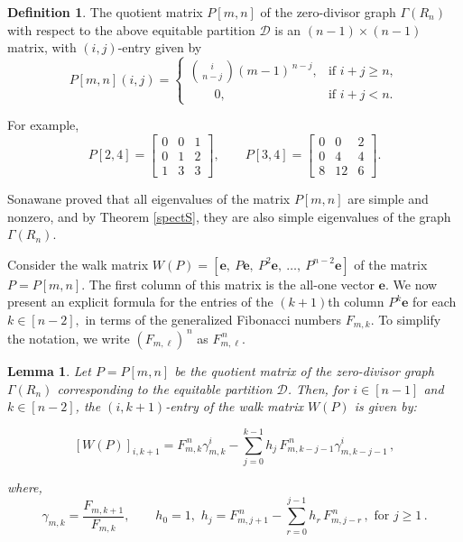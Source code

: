 \documentclass[11pt,oneside]{article}
\theoremstyle{plain}
\theoremstyle{plain}
\newtheorem{lem}[theorem]{Lemma}
\theoremstyle{definition}
\newtheorem{defi}[theorem]{Definition}
\numberwithin{figure}{section}
\theoremstyle{remark}
\numberwithin{equation}{section}
\begin{document}
	\begin{defi}\cite{sonawane1}
		The quotient matrix $P[m,n]$ of the zero-divisor graph $\Gamma(R_n)$ with respect to the above equitable partition $\mathcal{D}$ is an $(n-1) \times (n-1)$ matrix, with $(i,j)$-entry given by
		\[
		P[m,n](i,j) =
		\begin{cases}
			\displaystyle \binom{i}{\,n-j\,}(m-1)^{\,n-j}, & \text{if } i + j \geq n, \\[6pt]
			\quad \quad 0, & \text{if } i + j < n.
		\end{cases}
		\]
	\end{defi}
	
	
	For example, 
	\[
	P[2,4] =
	\begin{bmatrix}
		0 & 0 & 1 \\
		0 & 1 & 2 \\
		1 & 3 & 3
	\end{bmatrix},
	\qquad
	P[3,4] =
	\begin{bmatrix}
		0 & 0 & 2 \\
		0 & 4 & 4 \\
		8 & 12 & 6
	\end{bmatrix}.
	\]
	
	Sonawane \cite{sonawane2} proved that all eigenvalues of the matrix \(  P[m,n]\) are simple and nonzero, and by Theorem \ref{spectS}, they are also simple eigenvalues of the graph $\Gamma(R_n).$
	
	Consider the walk matrix $W(P) = [\textbf{e},~ P\textbf{e},~ P^2\textbf{e},~ \dots,~ P^{n-2}\textbf{e}]$ of the matrix $P =P[m,n].$  The first column of this matrix is the all-one vector $\mathbf{e}.$  We now present an explicit formula for the entries of the $(k+1)$th column $P^k\mathbf{e}$ for each $ k \in [n-2],$
	in terms of the generalized Fibonacci numbers \(F_{m,k}\). To simplify the notation, we write \((F_{m,\ell})^{\,n}\) as \(F_{m,\ell}^{\,n}\).
	\begin{lem}\label{lem: entry of WP}
		Let $P = P[m,n]$ be the quotient matrix of the zero-divisor graph $\Gamma(R_n)$ corresponding to the equitable partition $\mathcal{D}$. Then, for $i \in [n-1]$ and $k \in [n-2]$, the $(i,k+1)$-entry of the walk matrix $W(P)$ is given by:
		
		
		\[
		[W(P)]_{i,k+1} = F_{m,k}^{\,n }  \gamma_{m,k}^i 
		- \sum_{j=0}^{k-1} h_j \, F_{m,k-j-1}^{\,n } \gamma_{m,k-j-1}^i\,,
		\]
		
		where,
		\[
		\gamma_{m,k} = \frac{F_{m,k+1}}{F_{m,k}}, 
		\qquad  h_0 =  1, \,\,
		h_j = F_{m,j+1}^{\,n }- \sum_{r=0}^{j-1} h_r \, F_{m,j-r}^{\,n }\,, \text{~for~} j\geq 1\, .
		\]
	\end{lem}
	
\end{document}
